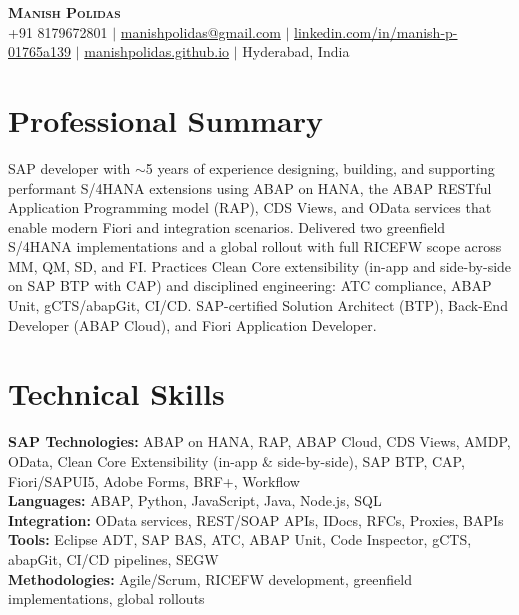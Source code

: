 \documentclass[letterpaper,11pt]{article}
\begin{document}
\begin{center}
    \textbf{\Huge \scshape Manish Polidas} \\ \vspace{1pt}
    \small +91 8179672801 $|$ \href{mailto:manishpolidas@gmail.com}{manishpolidas@gmail.com} $|$
    \href{https://www.linkedin.com/in/manish-p-01765a139/}{linkedin.com/in/manish-p-01765a139} $|$
    \href{https://manishpolidas.github.io}{manishpolidas.github.io} $|$ Hyderabad, India
\end{center}

\section{Professional Summary}
SAP developer with $\sim$5 years of experience designing, building, and supporting performant S/4HANA extensions using ABAP on HANA, the ABAP RESTful Application Programming model (RAP), CDS Views, and OData services that enable modern Fiori and integration scenarios. Delivered two greenfield S/4HANA implementations and a global rollout with full RICEFW scope across MM, QM, SD, and FI. Practices Clean Core extensibility (in-app and side-by-side on SAP BTP with CAP) and disciplined engineering: ATC compliance, ABAP Unit, gCTS/abapGit, CI/CD. SAP-certified Solution Architect (BTP), Back-End Developer (ABAP Cloud), and Fiori Application Developer.

\section{Technical Skills}
 \begin{itemize}[leftmargin=0.15in, label={}]
    \small{\item{
     \textbf{SAP Technologies:} ABAP on HANA, RAP, ABAP Cloud, CDS Views, AMDP, OData, Clean Core Extensibility (in-app \& side-by-side), SAP BTP, CAP, Fiori/SAPUI5, Adobe Forms, BRF+, Workflow \\
     \textbf{Languages:} ABAP, Python, JavaScript, Java, Node.js, SQL \\
     \textbf{Integration:} OData services, REST/SOAP APIs, IDocs, RFCs, Proxies, BAPIs \\
     \textbf{Tools:} Eclipse ADT, SAP BAS, ATC, ABAP Unit, Code Inspector, gCTS, abapGit, CI/CD pipelines, SEGW \\
     \textbf{Methodologies:} Agile/Scrum, RICEFW development, greenfield implementations, global rollouts \\
    }}
 \end{itemize}
\end{document}
